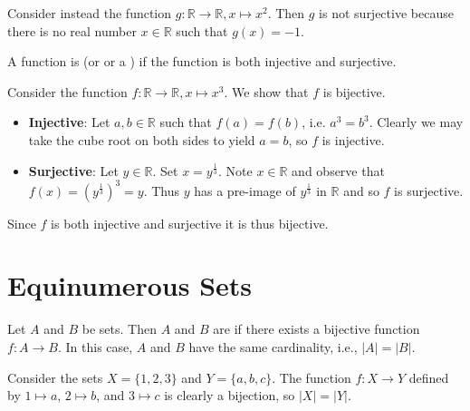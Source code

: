 \begin{example}
    Consider instead the function $g: \mathbb{R} \to \mathbb{R}, x \mapsto x^2$. Then $g$ is not surjective because there is no real number $x \in \mathbb{R}$ such that $g(x) = -1$.
\end{example}

\begin{definition}
    A function is  (or  or a ) if the function is both injective and surjective.
\end{definition}

\begin{example}
    Consider the function $f: \mathbb{R} \to \mathbb{R}, x \mapsto x^3$. We show that $f$ is bijective.
    \begin{itemize}
        \item \textbf{Injective}: Let $a, b \in \mathbb{R}$ such that $f(a) = f(b)$, i.e. $a^3 = b^3$. Clearly we may take the cube root on both sides to yield $a = b$, so $f$ is injective.
        \item \textbf{Surjective}: Let $y \in \mathbb{R}$. Set $x=y^{\frac13}$. Note $x \in \mathbb{R}$ and observe that $f(x) = \left(y^{\frac13}\right)^3 = y$. Thus $y$ has a pre-image of $y^{\frac13}$ in $\mathbb{R}$ and so $f$ is surjective.
    \end{itemize}
    Since $f$ is both injective and surjective it is thus bijective.
\end{example}

\section{Equinumerous Sets}
\begin{definition}
    Let $A$ and $B$ be sets. Then $A$ and $B$ are  if there exists a bijective function $f: A \to B$. In this case, $A$ and $B$ have the same cardinality, i.e., $|A| = |B|$.
\end{definition}

\begin{example}
    Consider the sets $X = \{1, 2, 3\}$ and $Y = \{a, b, c\}$. The function $f: X \to Y$ defined by $1 \mapsto a$, $2 \mapsto b$, and $3 \mapsto c$ is clearly a bijection, so $|X| = |Y|$.
\end{example}

